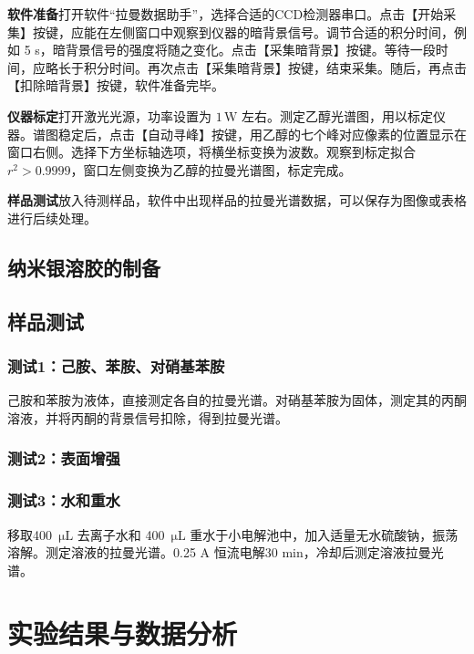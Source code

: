 \documentclass[UTF8]{article}
\newcommand{\dw}[1]{\,\mathrm{#1}}
\begin{document}
	\textbf{软件准备}\quad 打开软件“拉曼数据助手”，选择合适的CCD检测器串口。点击【开始采集】按键，应能在左侧窗口中观察到仪器的暗背景信号。调节合适的积分时间，例如 5 s，暗背景信号的强度将随之变化。点击【采集暗背景】按键。等待一段时间，应略长于积分时间。再次点击【采集暗背景】按键，结束采集。随后，再点击【扣除暗背景】按键，软件准备完毕。
	
	\textbf{仪器标定}\quad 打开激光光源，功率设置为 $1 \dw{W}$ 左右。测定乙醇光谱图，用以标定仪器。谱图稳定后，点击【自动寻峰】按键，用乙醇的七个峰对应像素的位置显示在窗口右侧。选择下方坐标轴选项，将横坐标变换为波数。观察到标定拟合 $r^2>0.9999$，窗口左侧变换为乙醇的拉曼光谱图，标定完成。

	\textbf{样品测试}\quad 放入待测样品，软件中出现样品的拉曼光谱数据，可以保存为图像或表格进行后续处理。

	\subsection{纳米银溶胶的制备}

	\subsection{样品测试}
	\subsubsection{测试1：己胺、苯胺、对硝基苯胺}
	己胺和苯胺为液体，直接测定各自的拉曼光谱。对硝基苯胺为固体，测定其的丙酮溶液，并将丙酮的背景信号扣除，得到拉曼光谱。

	\subsubsection{测试2：表面增强}

	\subsubsection{测试3：水和重水}
	移取400 $\dw{\mu L}$ 去离子水和 400 $\dw{\mu L}$ 重水于小电解池中，加入适量无水硫酸钠，振荡溶解。测定溶液的拉曼光谱。0.25 A 恒流电解30 min，冷却后测定溶液拉曼光谱。
	
	\section{实验结果与数据分析}
\end{document}
